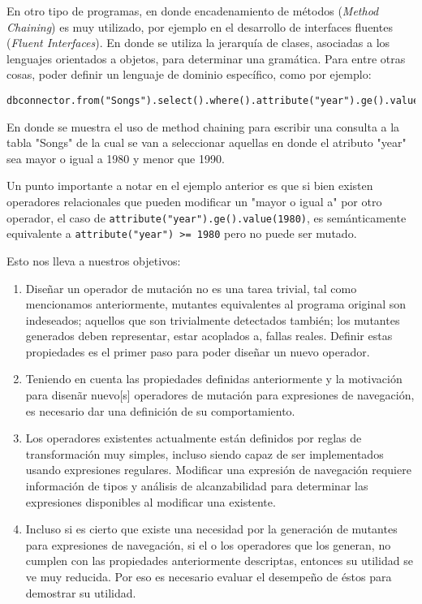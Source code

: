 En otro tipo de programas, en donde encadenamiento de m\'etodos (\emph{Method Chaining}) es muy utilizado, por ejemplo en el desarrollo de interfaces fluentes (\emph{Fluent Interfaces}). En donde se utiliza la jerarqu\'ia de clases, asociadas a los lenguajes orientados a objetos, para determinar una gram\'atica. Para entre otras cosas, poder definir un lenguaje de dominio espec\'ifico, como por ejemplo:
\begin{center}
	\begin{lstlisting}[frame=tlrb, mathescape=true]
	dbconnector.from("Songs").select().where().attribute("year").ge().value(1980).and().attribute("year").lt().value(1990).ejecute()
	\end{lstlisting}
\end{center}
En donde se muestra el uso de method chaining para escribir una consulta a la tabla "Songs" de la cual se van a seleccionar aquellas en donde el atributo "year" sea mayor o igual a 1980 y menor que 1990.

Un punto importante a notar en el ejemplo anterior es que si bien existen operadores relacionales que pueden modificar un "mayor o igual a" por otro operador, el caso de \texttt{attribute("year").ge().value(1980)}, es sem\'anticamente equivalente a \texttt{attribute("year") >= 1980} pero no puede ser mutado.

Esto nos lleva a nuestros objetivos:

\begin{enumerate}[leftmargin=.75cm,align=left]
	\item[Determinar las propiedades que un operador deber\'ia satisfacer]
	Dise\~nar un operador de mutaci\'on no es una tarea trivial, tal como mencionamos anteriormente, mutantes equivalentes al programa original son indeseados; aquellos que son trivialmente detectados tambi\'en; los mutantes generados deben representar, estar acoplados a, fallas reales. Definir estas propiedades es el primer paso para poder dise\~nar un nuevo operador.
	\item[Definir un operador de mutaci\'on para expresiones de navegaci\'on]
	Teniendo en cuenta las propiedades definidas anteriormente y la motivaci\'on para disen\~ar nuevo[s] operadores de mutaci\'on para expresiones de navegaci\'on, es necesario dar una definici\'on de su comportamiento.
	\item[Implementar el o los operadores de mutaci\'on para expresiones de navegaci\'on] 
	Los operadores existentes actualmente est\'an definidos por reglas de transformaci\'on muy simples, incluso siendo capaz de ser implementados usando expresiones regulares. Modificar una expresi\'on de navegaci\'on requiere informaci\'on de tipos y an\'alisis de alcanzabilidad para determinar las expresiones disponibles al modificar una existente.
	\item[Evaluaci\'on]
	Incluso si es cierto que existe una necesidad por la generaci\'on de mutantes para expresiones de navegaci\'on, si el o los operadores que los generan, no cumplen con las propiedades anteriormente descriptas, entonces su utilidad se ve muy reducida. Por eso es necesario evaluar el desempe\~no de \'estos para demostrar su utilidad.
\end{enumerate}

